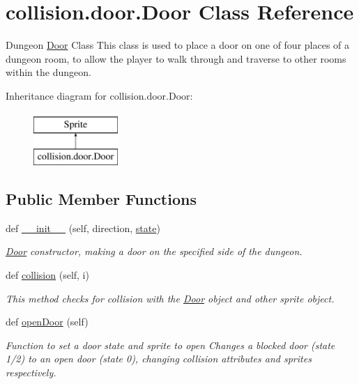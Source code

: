 \hypertarget{classcollision_1_1door_1_1_door}{}\section{collision.\+door.\+Door Class Reference}
\label{classcollision_1_1door_1_1_door}


Dungeon \hyperlink{classcollision_1_1door_1_1_door}{Door} Class  This class is used to place a door on one of four places of a dungeon room, to allow the player to walk through and traverse to other rooms within the dungeon.  


Inheritance diagram for collision.\+door.\+Door\+:\begin{figure}[H]
\begin{center}
\leavevmode
\includegraphics[height=2.000000cm]{classcollision_1_1door_1_1_door}
\end{center}
\end{figure}
\subsection*{Public Member Functions}
\begin{DoxyCompactItemize}
\item 
def \hyperlink{classcollision_1_1door_1_1_door_ab2b3e5e79d444388807a18f0c2022795}{\+\_\+\+\_\+init\+\_\+\+\_\+} (self, direction, \hyperlink{classcollision_1_1door_1_1_door_a22802ca389469576ecc1418e8c3e20b8}{state})
\begin{DoxyCompactList}\small\item\em \hyperlink{classcollision_1_1door_1_1_door}{Door} constructor, making a door on the specified side of the dungeon. \end{DoxyCompactList}\item 
def \hyperlink{classcollision_1_1door_1_1_door_a905d11890b7fa2fa789d67538136e685}{collision} (self, i)
\begin{DoxyCompactList}\small\item\em This method checks for collision with the \hyperlink{classcollision_1_1door_1_1_door}{Door} object and other sprite object. \end{DoxyCompactList}\item 
\mbox{\label{classcollision_1_1door_1_1_door_a9ae0128993d925a4c6bcdb79936dbc4a}} 
def \hyperlink{classcollision_1_1door_1_1_door_a9ae0128993d925a4c6bcdb79936dbc4a}{open\+Door} (self)
\begin{DoxyCompactList}\small\item\em Function to set a door state and sprite to open  Changes a blocked door (state 1/2) to an open door (state 0), changing collision attributes and sprites respectively. \end{DoxyCompactList}\end{DoxyCompactItemize}
